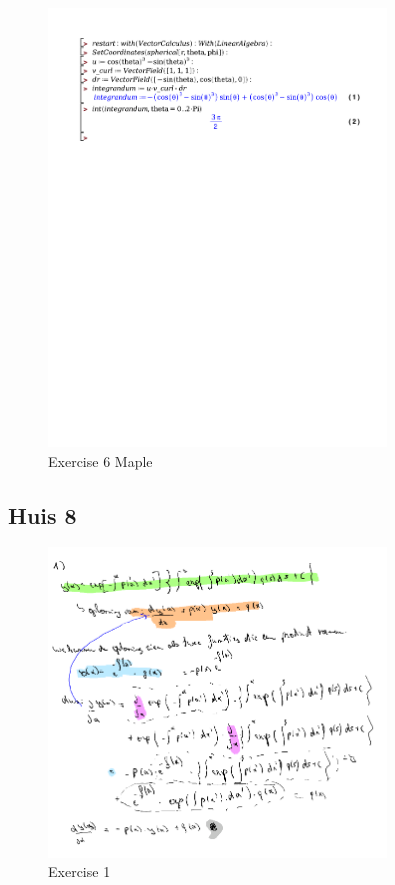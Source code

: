 \documentclass[a4paper]{report}
\begin{document}
\begin{figure}[H]
	\centering
	\includegraphics[width=0.8\textwidth]{exercises/huis_7_ex_6.pdf}
	\caption{Exercise 6 Maple}
	\label{fig:huis_7_ex_6}
\end{figure}

\subsection*{Huis 8}

\begin{figure}[H]
	\centering
	\includegraphics[width=0.8\textwidth]{assets/exercise_1_huis_8.png}
	\caption{Exercise 1}
	\label{fig:exercise_1_huis_8}
\end{figure}
\end{document}
